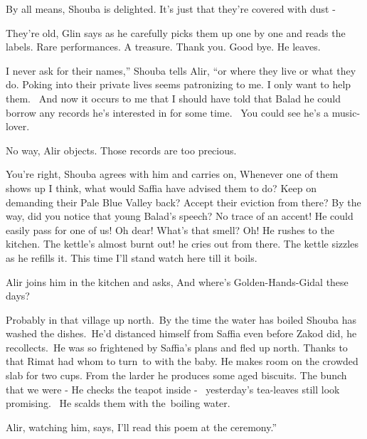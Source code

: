 \documentclass[twoside,11pt]{book}
\begin{document}
{\textquotedbl}By all means,{\textquotedbl} Shouba is delighted. {\textquotedbl}It's just that they're covered with dust
-{\textquotedbl} 

{\textquotedbl}They're old,{\textquotedbl} Glin says as he carefully picks them up one by one and reads the labels.
{\textquotedbl}Rare performances. A treasure. Thank you. Good bye.{\textquotedbl} He leaves.\ 

{\textquotedbl}I never ask for their names,'' Shouba tells Alir, ``or where they live or what they do. Poking into their
private lives seems patronizing to me. I only want to help them. ~And now it occurs to me that I should have told that
Balad he could borrow any records he's interested in for some time. \ You could see he's a music-lover.{\textquotedbl} 

{\textquotedbl}No way,{\textquotedbl} Alir objects. {\textquotedbl}Those records are too precious.{\textquotedbl} 

{\textquotedbl}You're right,{\textquotedbl} Shouba agrees with him and carries on, {\textquotedbl}Whenever one of them
shows up I think, what would Saffia have advised them to do? Keep on demanding their Pale Blue Valley back? Accept
their eviction from there? By the way, did you notice that young Balad{}'s speech? No trace of an accent! He could
easily pass for one of us! Oh dear! What's that smell? Oh!{\textquotedbl} He rushes to the kitchen. {\textquotedbl}The
kettle's almost burnt out!{\textquotedbl} he cries out from there. The kettle sizzles as he refills it.
{\textquotedbl}This time I'll stand watch here till it boils.{\textquotedbl}\ 

Alir joins him in the kitchen and asks, {\textquotedbl}And where's Golden-Hands-Gidal these days?{\textquotedbl} 

{\textquotedbl}Probably in that village up north.{\textquotedbl}\ By the time the water has boiled Shouba has washed the
dishes.\ {\textquotedbl}He'd distanced himself from Saffia even before Zakod did,{\textquotedbl} he
recollects.\ {\textquotedbl}He was so frightened by Saffia's plans and fled up north. Thanks to that Rimat had whom to
turn~to with the baby.{\textquotedbl} He makes room on the crowded slab for two cups. From the larder he produces some
aged biscuits. {\textquotedbl}The bunch that we were -{\textquotedbl} He checks the teapot inside - \ yesterday's
tea-leaves still look promising. ~He scalds them with the\ boiling water.

Alir, watching him, says, {\textquotedbl}I'll read this poem at the ceremony.''~ 
\end{document}
